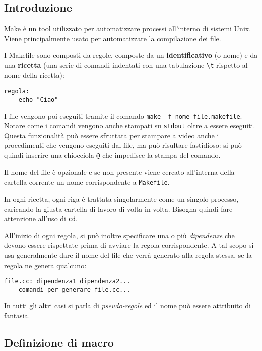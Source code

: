 \documentclass[a4paper]{article}
\begin{document}
\subsection{Introduzione}

Make è un tool utilizzato per automatizzare processi all'interno di sistemi Unix. Viene principalmente usato per automatizzare la compilazione dei file.

I Makefile sono composti da regole, composte da un \textbf{identificativo} (o nome) e da una \textbf{ricetta} (una serie di comandi indentati con una tabulazione \verb|\t| rispetto al nome della ricetta):

\begin{verbatim}
regola:
    echo "Ciao"
\end{verbatim}

I file vengono poi eseguiti tramite il comando \verb|make -f nome_file.makefile|. Notare come i comandi vengono anche stampati su \verb|stdout| oltre a essere eseguiti. Questa funzionalità può essere sfruttata per stampare a video anche i procedimenti che vengono eseguiti dal file, ma può risultare fastidioso: si può quindi inserire una chiocciola \verb|@| che impedisce la stampa del comando.

Il nome del file è opzionale e se non presente viene cercato all'interna della cartella corrente un nome corrispondente a \verb|Makefile|.

In ogni ricetta, ogni riga è trattata singolarmente come un singolo processo, caricando la giusta cartella di lavoro di volta in volta. Bisogna quindi fare attenzione all'uso di \verb|cd|.

All'inizio di ogni regola, si può inoltre specificare una o più \textit{dipendenze} che devono essere rispettate prima di avviare la regola corrispondente. A tal scopo si usa generalmente dare il nome del file che verrà generato alla regola stessa, se la regola ne genera qualcuno:

\begin{verbatim}
file.cc: dipendenza1 dipendenza2... 
    comandi per generare file.cc...
\end{verbatim}

In tutti gli altri casi si parla di \textit{pseudo-regole} ed il nome può essere attribuito di fantasia.

\subsection{Definizione di macro}
\end{document}
